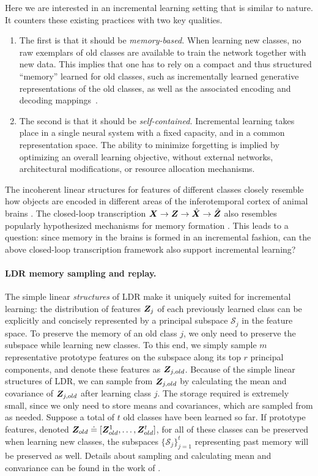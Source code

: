 \documentclass[../../book-main.tex]{subfiles}
\begin{document}
Here we are interested in an incremental learning setting that is similar to nature. It  counters these existing practices with two key qualities. 
\begin{enumerate}
    \item The first is that it should be \emph{memory-based.} When learning new classes, no raw exemplars of old classes are available to train the network together with new data. This implies that one has to rely on a compact and thus structured ``memory'' learned for old classes, such as incrementally learned generative representations of the old classes, as well as the associated encoding and decoding mappings~\cite{fearnet}. 
    \item The second is that it should be \emph{self-contained.} Incremental learning takes place in a single neural system with a fixed capacity, and in a common representation space. The ability to minimize forgetting is implied by optimizing an overall learning objective, without external networks, architectural modifications, or resource allocation mechanisms.
\end{enumerate}

The incoherent linear structures for features of different classes closely resemble how objects are encoded in different areas of the inferotemporal cortex of animal brains \cite{Chang-Cell-2017,Bao2020AMO}. The closed-loop transcription $\bm{X} \rightarrow \bm{Z} \rightarrow \hat{\bm{X}} \rightarrow \hat{\bm{Z}}$ also resembles popularly hypothesized mechanisms for memory formation \cite{2020Vandeven,Josselyn2020MemoryER}. This leads to a question: since memory in the brains is formed in an incremental fashion, can the above closed-loop transcription framework also support incremental learning?

\paragraph{LDR memory sampling and replay.} The simple linear {\em structures} of LDR make it uniquely suited for incremental learning: the distribution of features $\bm{Z}_j$ of each previously learned class can be explicitly and concisely represented by a principal subspace $\mathcal{S}_j$ in the feature space. To preserve the memory of an old class $j$, we only need to preserve the subspace while learning new classes. To this end, we simply sample $m$ representative prototype features on the subspace along its top $r$ principal components, and denote these features as $\bm{Z}_{j,old}$. Because of the simple linear structures of LDR, we can sample from $\bm{Z}_{j,old}$ by calculating the mean and covariance of $\bm{Z}_{j,old}$ after learning class $j$. The storage required is extremely small, since we only need to store means and covariances, which are sampled from as needed. Suppose a total of $t$ old classes have been learned so far. If prototype features, denoted $\bm{Z}_{old} \doteq [\bm{Z}^1_{old},\ldots, \bm{Z}^t_{old}]$, for all of these classes can be preserved when learning new classes, the subspaces $\{\mathcal{S}_j\}_{j=1}^t$ representing past memory will be preserved as well. Details about sampling and calculating mean and convariance can be found in the work of \cite{tong2023incremental}.
\end{document}
